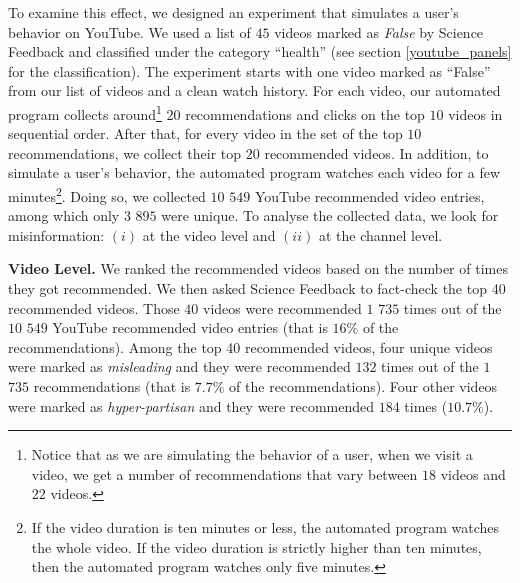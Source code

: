 \documentclass{article}
\begin{document}
To examine this effect, we designed an experiment that simulates a user's behavior on YouTube. We used a list of $45$ videos marked as {\it False} by Science Feedback and classified under the category ``health'' (see section \ref{youtube_panels} for the classification). The experiment starts with one video marked as ``False'' from our list of videos and a clean watch history. For each video, our automated program collects around\footnote{Notice that as we are simulating the behavior of a user, when we visit a video, we get a number of recommendations that vary between $18$ videos and $22$ videos.} $20$ recommendations and clicks on the top $10$ videos in sequential order. After that, for every video in the set of the top $10$ recommendations, we collect their top $20$ recommended videos. In addition, to simulate a user's behavior, the automated program watches each video for a few minutes\footnote{If the video duration is ten minutes or less, the automated program watches the whole video. If the video duration is strictly higher than ten minutes, then the automated program watches only five minutes.}. Doing so, we collected $10$ $549$ YouTube recommended video entries, among which only $3$ $895$ were unique. 
To analyse the collected data, we look for misinformation: $(i)$ at the video level and $(ii)$ at the channel level. 

\smallskip

{\bf Video Level.} We ranked the recommended videos based on the number of times they got recommended. We then asked Science Feedback to fact-check the top 40 recommended videos.
Those $40$ videos were recommended $1$ $735$ times out of the $10$ $549$ YouTube recommended video entries (that is $16\%$ of the recommendations).
Among the top 40 recommended videos, four unique videos were marked as {\it misleading} and they were recommended $132$ times out of the $1$ $735$ recommendations (that is $7.7\%$ of the recommendations).
Four other videos were marked as {\it hyper-partisan} and they were recommended $184$ times ($10.7\%$).

\smallskip 
\end{document}
